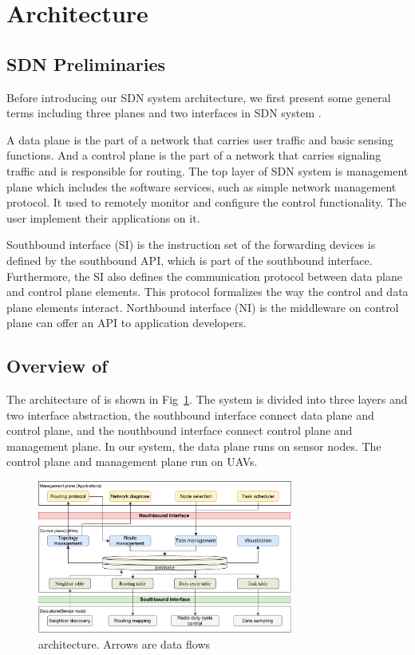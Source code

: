\section{Architecture}
\label{Arc}
\subsection{SDN Preliminaries}
Before introducing our SDN system architecture, we first present some general terms including three planes and two interfaces in SDN system \cite{kreutz2015software}.

A data plane is the part of a network that carries user traffic and basic sensing functions. And a control plane is the part of a network that carries signaling traffic and is responsible for routing. The top layer of SDN system is management plane which includes the software services, such as simple network management protocol. It used to remotely monitor and configure the control functionality. The user implement their applications on it.

Southbound interface (SI) is the instruction set of the forwarding devices is defined by the southbound API, which is part of the southbound interface. Furthermore, the SI also defines the communication protocol between data plane and control plane elements. This protocol formalizes the way the control and data plane elements interact. Northbound interface (NI) is the middleware on control plane can offer an API to application developers.

\subsection{Overview of {\sdn}}
The architecture of {\sdn} is shown in Fig~\ref{Architecture}. 
The system is divided into three layers and two interface abstraction, the southbound interface connect data plane and control plane, and the nouthbound interface connect control plane and management plane. In our system, the data plane runs on sensor nodes. The control plane and management plane run on UAVs.
\begin{figure}[htbp]
	\centering
	\includegraphics[width=3.3in]{./Figure/Architecture}
	\caption{{\sdn} architecture. \textnormal{Arrows are data flows}}
	\label{Architecture}
\end{figure}

